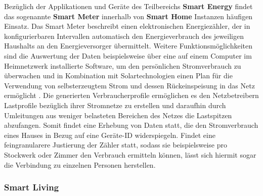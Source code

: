 Bezüglich der Applikationen und Geräte des Teilbereichs \textbf{Smart Energy} findet das sogenannte \textbf{Smart Meter} innerhalb von \textbf{Smart Home} Instanzen häufigen Einsatz. Das Smart Meter beschreibt einen elektronischen Energiezähler, der in konfigurierbaren Intervallen automatisch den Energieverbrauch des jeweiligen Haushalts an den Energieversorger übermittelt. 
Weitere Funktionsmöglichkeiten sind die Auswertung der Daten beispielsweise über eine auf einem Computer im Heimnetzwerk installierte Software, um den persönlichen Stromverbrauch zu überwachen und in Kombination mit Solartechnologien einen Plan für die Verwendung von selbsterzeugtem Strom und dessen Rückeinspeisung in das Netz ermöglicht \cite{Fox2010}. 
Die generierten Verbraucherprofile ermöglichen es den Netzbetreibern Lastprofile bezüglich ihrer Stromnetze zu erstellen und daraufhin durch Umleitungen aus weniger belasteten Bereichen des Netzes die Lastspitzen abzufangen. 
Somit findet eine Erhebung von Daten statt, die den Stromverbrauch eines Hauses in Bezug auf eine Geräte-ID widerspiegeln. Findet eine feingranularere Justierung der Zähler statt, sodass sie beispielsweise pro Stockwerk oder Zimmer den Verbrauch ermitteln können, lässt sich hiermit sogar die Verbindung zu einzelnen Personen herstellen.

\subsubsection{Smart Living}
\label{sec:Analyse der Datenerhebung:ssec:Smart City:sssec:Smart Living}

